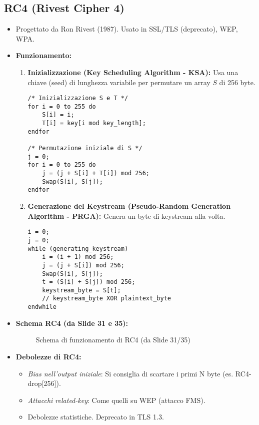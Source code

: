 \subsection{RC4 (Rivest Cipher 4)}
\begin{itemize}
    \item Progettato da Ron Rivest (1987). Usato in SSL/TLS (deprecato), WEP, WPA.
    \item \textbf{Funzionamento:}
    \begin{enumerate}
        \item \textbf{Inizializzazione (Key Scheduling Algorithm - KSA):}
        Usa una chiave (seed) di lunghezza variabile per permutare un array $S$ di 256 byte.
        \begin{verbatim}
/* Inizializzazione S e T */
for i = 0 to 255 do
    S[i] = i;
    T[i] = key[i mod key_length];
endfor

/* Permutazione iniziale di S */
j = 0;
for i = 0 to 255 do
    j = (j + S[i] + T[i]) mod 256;
    Swap(S[i], S[j]);
endfor
        \end{verbatim}
        \item \textbf{Generazione del Keystream (Pseudo-Random Generation Algorithm - PRGA):}
        Genera un byte di keystream alla volta.
        \begin{verbatim}
i = 0;
j = 0;
while (generating_keystream)
    i = (i + 1) mod 256;
    j = (j + S[i]) mod 256;
    Swap(S[i], S[j]);
    t = (S[i] + S[j]) mod 256;
    keystream_byte = S[t];
    // keystream_byte XOR plaintext_byte
endwhile
        \end{verbatim}
    \end{enumerate}
    \item \textbf{Schema RC4 (da Slide 31 e 35):}
    \begin{figure}[H]
        \centering
        \caption{Schema di funzionamento di RC4 (da Slide 31/35)}
    \end{figure}
    \item \textbf{Debolezze di RC4:}
    \begin{itemize}
        \item \textit{Bias nell'output iniziale}: Si consiglia di scartare i primi N byte (es. RC4-drop[256]).
        \item \textit{Attacchi related-key}: Come quelli su WEP (attacco FMS).
        \item Debolezze statistiche. Deprecato in TLS 1.3.
    \end{itemize}
\end{itemize}

